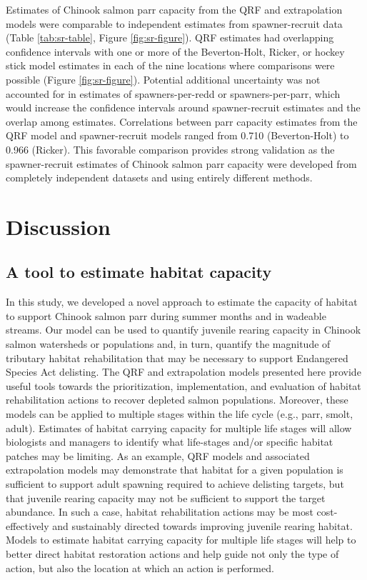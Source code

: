 \documentclass[
  12pt,
]{article}
\begin{document}
Estimates of Chinook salmon parr capacity from the QRF and extrapolation models were comparable to independent estimates from spawner-recruit data (Table \ref{tab:sr-table}, Figure \ref{fig:sr-figure}). QRF estimates had overlapping confidence intervals with one or more of the Beverton-Holt, Ricker, or hockey stick model estimates in each of the nine locations where comparisons were possible (Figure \ref{fig:sr-figure}). Potential additional uncertainty was not accounted for in estimates of spawners-per-redd or spawners-per-parr, which would increase the confidence intervals around spawner-recruit estimates and the overlap among estimates. Correlations between parr capacity estimates from the QRF model and spawner-recruit models ranged from 0.710 (Beverton-Holt) to 0.966 (Ricker). This favorable comparison provides strong validation as the spawner-recruit estimates of Chinook salmon parr capacity were developed from completely independent datasets and using entirely different methods.

\hypertarget{discussion}{%
\section{Discussion}\label{discussion}}

\hypertarget{a-tool-to-estimate-habitat-capacity}{%
\subsection{A tool to estimate habitat capacity}\label{a-tool-to-estimate-habitat-capacity}}

In this study, we developed a novel approach to estimate the capacity of habitat to support Chinook salmon parr during summer months and in wadeable streams. Our model can be used to quantify juvenile rearing capacity in Chinook salmon watersheds or populations and, in turn, quantify the magnitude of tributary habitat rehabilitation that may be necessary to support Endangered Species Act delisting. The QRF and extrapolation models presented here provide useful tools towards the prioritization, implementation, and evaluation of habitat rehabilitation actions to recover depleted salmon populations. Moreover, these models can be applied to multiple stages within the life cycle (e.g., parr, smolt, adult). Estimates of habitat carrying capacity for multiple life stages will allow biologists and managers to identify what life-stages and/or specific habitat patches may be limiting. As an example, QRF models and associated extrapolation models may demonstrate that habitat for a given population is sufficient to support adult spawning required to achieve delisting targets, but that juvenile rearing capacity may not be sufficient to support the target abundance. In such a case, habitat rehabilitation actions may be most cost-effectively and sustainably directed towards improving juvenile rearing habitat. Models to estimate habitat carrying capacity for multiple life stages will help to better direct habitat restoration actions and help guide not only the type of action, but also the location at which an action is performed.
\end{document}
